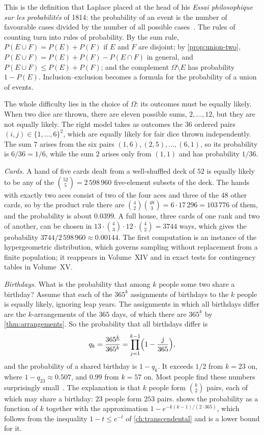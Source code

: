 This is the definition that Laplace placed at the head of his \emph{Essai philosophique sur les probabilit\'es} of 1814: the probability of an event is the number of favourable cases divided by the number of all possible cases~\cite{laplace1814}. The rules of counting turn into rules of probability. By the sum rule, $P(E\cup F)=P(E)+P(F)$ if $E$ and $F$ are disjoint; by \cref{prop:union-two}, $P(E\cup F)=P(E)+P(F)-P(E\cap F)$ in general, and $P(E\cup F)\le P(E)+P(F)$; and the complement $\Omega\setminus E$ has probability $1-P(E)$. Inclusion--exclusion becomes a formula for the probability of a union of events.

The whole difficulty lies in the choice of $\Omega$: its outcomes must be equally likely. When two dice are thrown, there are eleven possible sums, $2,\ldots,12$, but they are not equally likely. The right model takes as outcomes the $36$ ordered pairs $(i,j)\in\{1,\ldots,6\}^2$, which are equally likely for fair dice thrown independently. The sum $7$ arises from the six pairs $(1,6),(2,5),\ldots,(6,1)$, so its probability is $6/36=1/6$, while the sum $2$ arises only from $(1,1)$ and has probability $1/36$.

\emph{Cards.} A hand of five cards dealt from a well-shuffled deck of $52$ is equally likely to be any of the $\binom{52}5=2\,598\,960$ five-element subsets of the deck. The hands with exactly two aces consist of two of the four aces and three of the $48$ other cards, so by the product rule there are $\binom42\binom{48}3=6\cdot17\,296=103\,776$ of them, and the probability is about $0.0399$. A full house, three cards of one rank and two of another, can be chosen in $13\cdot\binom43\cdot12\cdot\binom42=3744$ ways, which gives the probability $3744/2\,598\,960\approx0.00144$. The first computation is an instance of the hypergeometric distribution, which governs sampling without replacement from a finite population; it reappears in Volume~XIV and in exact tests for contingency tables in Volume~XV.

\emph{Birthdays.} What is the probability that among $k$ people some two share a birthday? Assume that each of the $365^k$ assignments of birthdays to the $k$ people is equally likely, ignoring leap years. The assignments in which all birthdays differ are the $k$-arrangements of the $365$ days, of which there are $365^{\underline k}$ by \cref{thm:arrangements}. So the probability that all birthdays differ is
\[
q_k=\frac{365^{\underline k}}{365^k}=\prod_{j=1}^{k-1}\Bigl(1-\frac{j}{365}\Bigr),
\]
and the probability of a shared birthday is $1-q_k$. It exceeds $1/2$ from $k=23$ on, where $1-q_{23}\approx0.507$, and $0.99$ from $k=57$ on. Most people find these numbers surprisingly small~\cite{feller1968}. The explanation is that $k$ people form $\binom k2$ pairs, each of which may share a birthday: $23$ people form $253$ pairs.  shows the probability as a function of $k$ together with the approximation $1-e^{-k(k-1)/(2\cdot365)}$, which follows from the inequality $1-t\le e^{-t}$ of \cref{ch:transcendental} and is a lower bound for it.

